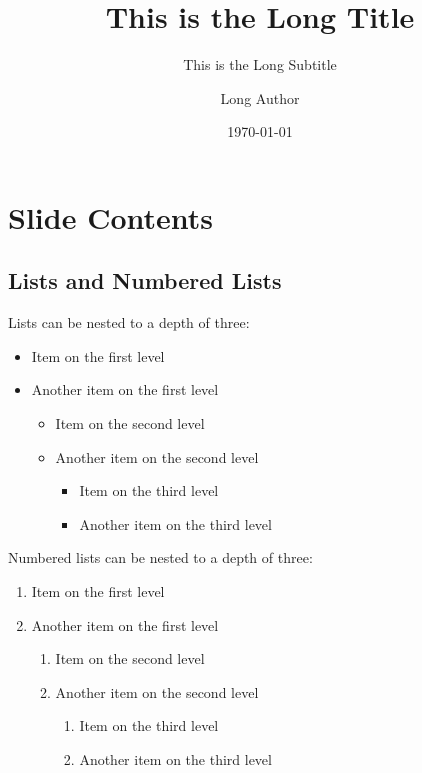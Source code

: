 \documentclass[
	aspectratio=169, %
	8pt, %
]{beamer}
\title[Short Title]{This is the Long Title} %
\subtitle[Short Subtitle]{This is the Long Subtitle} %
\author[Short Author]{Long Author} %
\date{\today} %
\begin{document}
\maketitle[iz][400] %

\section{Slide Contents}

\subsection{Lists and Numbered Lists}
\begin{frame}{\insertsubsection}
	\begin{fancycolumns}
		Lists can be nested to a depth of three:
		\begin{itemize}
			\item Item on the first level
			\item Another item on the first level
			\begin{itemize}
				\item Item on the second level
				\item Another item on the second level
			\begin{itemize}
			\item Item on the third level
			\item Another item on the third level
			\end{itemize}
		\end{itemize}
	\end{itemize}
	\nextcolumn
	Numbered lists can be nested to a depth of three:
	\begin{enumerate}
		\item Item on the first level
		\item Another item on the first level
		\begin{enumerate}
			\item Item on the second level
			\item Another item on the second level
				\begin{enumerate}
					\item Item on the third level
					\item Another item on the third level
				\end{enumerate}
			\end{enumerate}
		\end{enumerate}
	\end{fancycolumns}
\end{frame}
\end{document}
